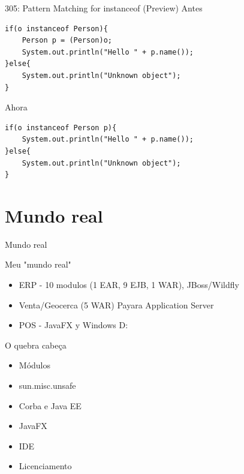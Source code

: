 \documentclass[aspectratio=169]{beamer}
\begin{document}
\begin{frame}[fragile]{305:	Pattern Matching for instanceof (Preview)}
Antes
\begin{lstlisting}
if(o instanceof Person){
    Person p = (Person)o;
    System.out.println("Hello " + p.name());
}else{
    System.out.println("Unknown object");
}
\end{lstlisting}	

Ahora
\begin{lstlisting}
if(o instanceof Person p){
    System.out.println("Hello " + p.name());
}else{
    System.out.println("Unknown object");
}
\end{lstlisting}	
\end{frame}

{
    \section{Mundo real}
}

\begin{frame}[fragile]{Mundo real}\scriptsize
    
Meu "mundo real"
    \begin{itemize}
        \item ERP - 10 modulos (1 EAR, 9 EJB, 1 WAR), JBoss/Wildfly
        \item Venta/Geocerca (5 WAR) Payara Application Server
        \item POS - JavaFX y Windows D:
    \end{itemize}
    O quebra cabeça
\begin{itemize}
    \item Módulos
    \item sun.misc.unsafe
    \item Corba e Java EE
    \item JavaFX
    \item IDE
    \item Licenciamento
\end{itemize}
\end{frame}
\end{document}
